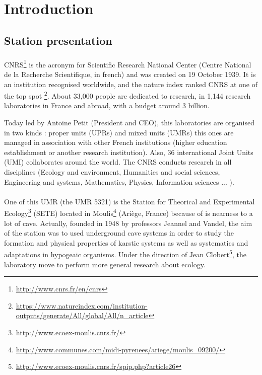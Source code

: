 \documentclass{article}
\begin{document}
\newpage
{}
\section*{Introduction}

\subsection*{Station presentation}

\paragraph{}
CNRS\footnote{\url{http://www.cnrs.fr/en/cnrs}} is the acronym for Scientific Research National Center (Centre National de la Recherche Scientifique, in french) and was created on 19 October 1939. It is an institution recognised worldwide,  and the nature index ranked CNRS at one of the top spot \footnote{\url{https://www.natureindex.com/institution-outputs/generate/All/global/All/n_article}}. About 33,000 people are dedicated to research, in 1,144 research laboratories in France and abroad, with a budget around 3 billion. 

Today led by Antoine Petit (President and CEO), this laboratories are organised in two kinds : proper units (UPRs) and mixed units (UMRs) this ones are managed in association with other French institutions (higher education establishment or another research institution). Also, 36 international Joint Units (UMI) collaborates around the world. The CNRS conducts research in all disciplines (Ecology and environment, Humanities and social sciences, Engineering and systems, Mathematics, Physics, Information sciences ... ).


\paragraph{}
One of this UMR (the UMR 5321) is  the Station for Theorical and Experimental Ecology\footnote{\url{http://www.ecoex-moulis.cnrs.fr/}} (SETE) located in Moulis\footnote{\url{http://www.communes.com/midi-pyrenees/ariege/moulis_09200/}} (Ariège, France) because of is nearness to a lot of cave. Actually, founded in 1948 by professors Jeannel and Vandel, the aim of the station was to used underground cave systems in order to study the formation and physical properties of karstic systems as well as systematics and adaptations in hypogeaic organisms. Under the direction of Jean Clobert\footnote{\url{http://www.ecoex-moulis.cnrs.fr/spip.php?article26}}, the laboratory move to perform more general research about ecology.
\end{document}
